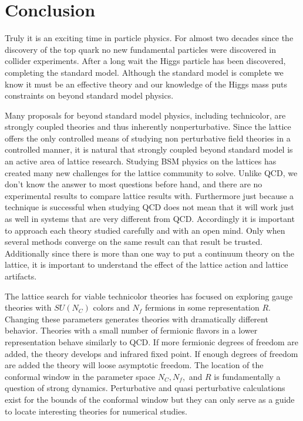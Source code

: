 \chapter{Conclusion}
\label{ch:conclusion}

Truly it is an exciting time in particle physics.
For almost two decades since the discovery of the top quark no new fundamental particles were discovered in collider experiments.
After a long wait the Higgs particle has been discovered, completing the standard model.
Although the standard model is complete we know it must be an effective theory and our knowledge of the Higgs mass puts constraints on beyond standard model physics.

Many proposals for beyond standard model physics, including technicolor, are strongly coupled theories and thus inherently nonperturbative.
Since the lattice offers the only controlled means of studying non perturbative field theories in a controlled manner, it is natural that strongly coupled beyond standard model is an active area of lattice research.
Studying BSM physics on the lattices has created many new challenges for the lattice community to solve.
Unlike QCD, we don't know the answer to most questions before hand, and there are no experimental results to compare lattice results with.
Furthermore just because a technique is successful when studying QCD does not mean that it will work just as well in systems that are very different from QCD.
Accordingly it is important to approach each theory studied carefully and with an open mind.
Only when several methods converge on the same result can that result be trusted.
Additionally since there is more than one way to put a continuum theory on the lattice, it is important to understand the effect of the lattice action and lattice artifacts.

The lattice search for viable technicolor theories has focused on exploring gauge theories with $SU(N_C)$ colors and $N_f$ fermions in some representation $R$.
Changing these parameters generates theories with dramatically different behavior.
Theories with a small number of fermionic flavors in a lower representation behave similarly to QCD.
If more fermionic degrees of freedom are added, the theory develops and infrared fixed point.
If enough degrees of freedom are added the theory will loose asymptotic freedom.
The location of the conformal window in the parameter space $N_C, N_f,$ and $R$ is fundamentally a question of strong dynamics.
Perturbative and quasi perturbative calculations exist for the bounds of the conformal window but they can only serve as a guide to locate interesting theories for numerical studies.


